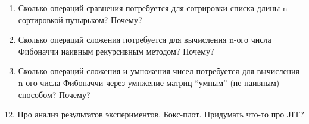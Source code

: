 \begin{enumerate}
\begin{enumerate}
           \item Сколько операций сравнения потребуется для сотрировки списка длины n сортировкой пузырьком? Почему?
           \item Сколько операций сложения потребуется для вычисления n-ого числа Фибоначчи наивным рекурсивным методом? Почему?
           \item Сколько операций сложения и умножения чисел потребуется для вычисления n-ого числа Фибоначчи через умнжение матриц ``умным'' (не наивным) способом? Почему?
        \end{enumerate} 
\end{enumerate}

12. Про анализ результатов экспериментов. Бокс-плот. Придумать что-то про JIT? 




















